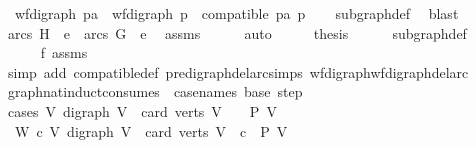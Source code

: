 \begin{isabellebody}
\ \ wf{\isacharunderscore}{\kern0pt}digraph\ pa\ {\isasymand}\ wf{\isacharunderscore}{\kern0pt}digraph\ p\ {\isasymand}\ compatible\ pa\ p{\isacharparenright}{\kern0pt}{\isachardoublequoteclose}\isanewline
\ \ \isamarkupfalse%
\ subgraph{\isacharunderscore}{\kern0pt}def\ \isamarkupfalse%
\ blast\isanewline
\ \ \isamarkupfalse%
\ {\isachardoublequoteopen}arcs\ H\ {\isacharminus}{\kern0pt}\ {\isacharbraceleft}{\kern0pt}e{}{\isacharbraceright}{\kern0pt}\ {\isasymsubseteq}\ arcs\ G\ {\isacharminus}{\kern0pt}\ {\isacharbraceleft}{\kern0pt}e{}{\isacharbraceright}{\kern0pt}{\isachardoublequoteclose}\ \isamarkupfalse%
\ assms{\isacharparenleft}{\kern0pt}{}{\isacharparenright}{\kern0pt}\isanewline
\ \ \ \ \isamarkupfalse%
\ auto\isanewline
\ \ \isamarkupfalse%
\ \isamarkupfalse%
\ {\isacharquery}{\kern0pt}thesis\isanewline
\ \ \ \ \isamarkupfalse%
\ subgraph{\isacharunderscore}{\kern0pt}def\ \isanewline
\ \ \ \ \isamarkupfalse%
\ f{}\ assms{\isacharparenleft}{\kern0pt}{}{\isacharparenright}{\kern0pt}\ \isamarkupfalse%
\ {\isacharparenleft}{\kern0pt}simp\ add{\isacharcolon}{\kern0pt}\ compatible{\isacharunderscore}{\kern0pt}def\ pre{\isacharunderscore}{\kern0pt}digraph{\isachardot}{\kern0pt}del{\isacharunderscore}{\kern0pt}arc{\isacharunderscore}{\kern0pt}simps\ wf{\isacharunderscore}{\kern0pt}digraph{\isachardot}{\kern0pt}wf{\isacharunderscore}{\kern0pt}digraph{\isacharunderscore}{\kern0pt}del{\isacharunderscore}{\kern0pt}arc{\isacharparenright}{\kern0pt}\isanewline
{}\isamarkupfalse%
%
\endisatagproof
{\isafoldproof}%
%
\isadelimproof
\isanewline
%
\endisadelimproof
\isanewline
{}\isamarkupfalse%
\ graph{\isacharunderscore}{\kern0pt}nat{\isacharunderscore}{\kern0pt}induct{\isacharbrackleft}{\kern0pt}consumes\ {}{\isacharcomma}{\kern0pt}\ case{\isacharunderscore}{\kern0pt}names\ base\ step{\isacharbrackright}{\kern0pt}{\isacharcolon}{\kern0pt}\ \isanewline
\ \ \isanewline
\isanewline
\ cases{\isacharcolon}{\kern0pt}\ {\isachardoublequoteopen}{\isasymAnd}V{\isachardot}{\kern0pt}\ {\isacharparenleft}{\kern0pt}digraph\ V\ {\isasymLongrightarrow}\ card\ {\isacharparenleft}{\kern0pt}verts\ V{\isacharparenright}{\kern0pt}\ {\isacharequal}{\kern0pt}\ {}\ {\isasymLongrightarrow}\ P\ V{\isacharparenright}{\kern0pt}{\isachardoublequoteclose}\isanewline
\ \ {\isachardoublequoteopen}{\isasymAnd}W\ c{\isachardot}{\kern0pt}\ {\isacharparenleft}{\kern0pt}{\isasymAnd}V{\isachardot}{\kern0pt}\ {\isacharparenleft}{\kern0pt}digraph\ V\ {\isasymLongrightarrow}\ card\ {\isacharparenleft}{\kern0pt}verts\ V{\isacharparenright}{\kern0pt}\ {\isacharequal}{\kern0pt}\ c\ {\isasymLongrightarrow}\ P\ V{\isacharparenright}{\kern0pt}{\isacharparenright}{\kern0pt}\ \isanewline

\end{isabellebody}
